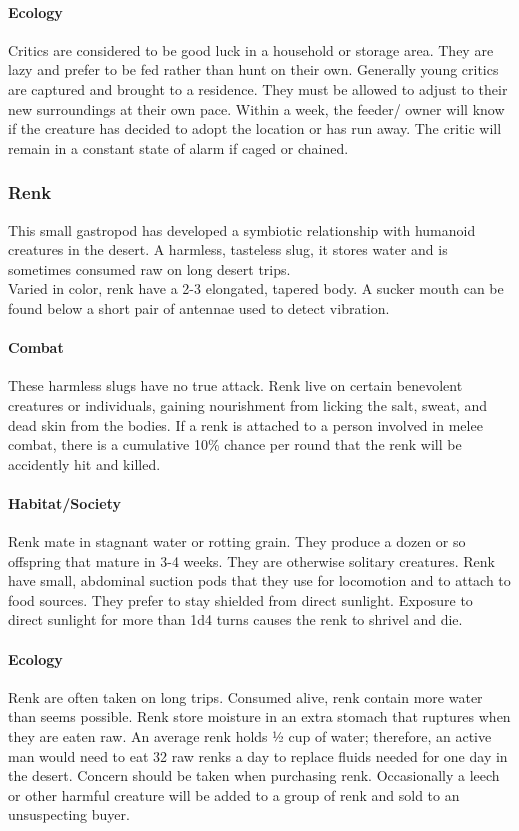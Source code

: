 \paragraph{Ecology}
Critics are considered to be good luck in a household
or storage area. They are lazy and prefer to be fed rather than
hunt on their own. Generally young critics are captured and
brought to a residence. They must be allowed to adjust to their
new surroundings at their own pace. Within a week, the feeder/
owner will know if the creature has decided to adopt the
location or has run away. The critic will remain in a constant
state of alarm if caged or chained.

\subsubsection{Renk}

This small gastropod has developed a symbiotic relationship
with humanoid creatures in the desert. A harmless, tasteless
slug, it stores water and is sometimes consumed raw on long
desert trips.\\
Varied in color, renk have a 2-3 elongated, tapered body. A
sucker mouth can be found below a short pair of antennae used
to detect vibration.

\paragraph{Combat}
These harmless slugs have no true attack. Renk live on
certain benevolent creatures or individuals, gaining nourishment
from licking the salt, sweat, and dead skin from the
bodies. If a renk is attached to a person involved in melee combat,
there is a cumulative 10\% chance per round that the renk
will be accidently hit and killed.

\paragraph{Habitat/Society}
 Renk mate in stagnant water or rotting grain.
They produce a dozen or so offspring that mature in 3-4 weeks.
They are otherwise solitary creatures. Renk have small, abdominal
suction pods that they use for locomotion and to attach to
food sources. They prefer to stay shielded from direct sunlight.
Exposure to direct sunlight for more than 1d4 turns causes the
renk to shrivel and die.

\paragraph{Ecology}
Renk are often taken on long trips. Consumed alive,
renk contain more water than seems possible. Renk store moisture
in an extra stomach that ruptures when they are eaten raw.
An average renk holds 1⁄2 cup of water; therefore, an active
man would need to eat 32 raw renks a day to replace fluids needed
for one day in the desert. Concern should be taken when purchasing
renk. Occasionally a leech or other harmful creature
will be added to a group of renk and sold to an unsuspecting
buyer.

